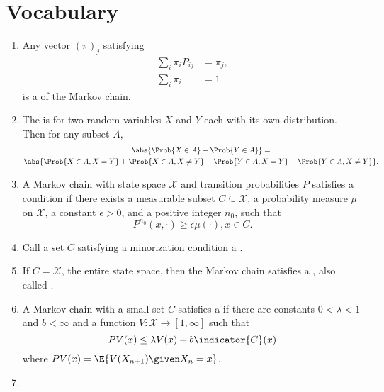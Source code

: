 \documentclass[12pt]{article}
\begin{document}
\section*{Vocabulary}
\begin{enumerate}
    \item
        Any vector \( (\pi)_{j} \) satisfying
        \begin{align*}
            \sum\limits_{i} \pi_{i} P_{ij} &= \pi_{j},\\
            \sum\limits_{i} \pi_{i} &= 1
        \end{align*}
        is a  of the Markov
        chain.
    \item
        The  is for two random variables \( X \)
        and \( Y \) each with its own distribution.  Then for any subset
        \( A \),
        \begin{multline*}
            \abs{\Prob{X \in A} - \Prob{Y \in A}} = \\
            \abs{\Prob{X \in A, X = Y} + \Prob{X \in A, X \ne Y } -
            \Prob{Y \in A, X = Y} - \Prob{Y \in A, X \ne Y}}.
        \end{multline*}
    \item
        A Markov chain with state space \( \mathcal{X} \) and transition
        probabilities \( P \) satisfies a  condition
        if there exists a measurable subset \( C \subseteq \mathcal{X} \),
        a probability measure \( \mu \) on \( \mathcal{X} \), a constant
        \( \epsilon > 0 \), and a positive integer \( n_0 \), such that
        \[
            P^{n_0} (x, \cdot) \ge \epsilon \mu(\cdot), x \in C.
        \]
    \item
        Call a set \( C \) satisfying a minorization condition a .
    \item
        If \( C = \mathcal{X} \), the entire state space, then the
        Markov chain satisfies a ,
        also called .
    \item
        A Markov chain with a small set \( C \) satisfies a  if there are constants \( 0 < \lambda < 1 \)
        and \( b < \infty \) and a function \( V :  \mathcal{X} \to [1,
        \infty] \) such that
        \[
            PV(x) \le \lambda V(x) + b \indicator{C}(x)
        \] where \( PV(x) = \E{V(X_{n+1}) \given X_n = x} \).
    \item

\end{enumerate}
\end{document}
